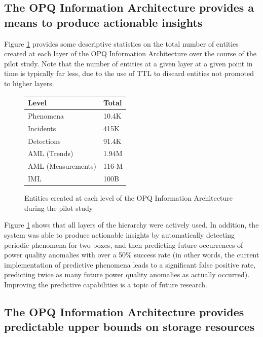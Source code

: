 \subsection{The OPQ Information Architecture provides a means to produce actionable insights}

Figure \ref{fig:level-statistics} provides some descriptive statistics on the total number of entities created at each layer of the OPQ Information Architecture over the course of the pilot study. Note that the number of entities at a given layer at a given point in time is typically far less, due to the use of TTL to discard entities not promoted to higher layers.

\begin{figure}[ht]
  \centering
		 \begin{tabularx}{.4\textwidth}{lX}
       \toprule
       \textbf{Level} & \textbf{Total}  \\
       \midrule
       Phenomena & 10.4K \\
       Incidents & 415K \\
       Detections & 91.4K \\
       AML (Trends) & 1.94M \\
       AML (Measurements) & 116 M \\
       IML  & 100B \\
       \bottomrule
     \end{tabularx}
	\caption{Entities created at each level of the OPQ Information Architecture during the pilot study}
	\label{fig:level-statistics}
\end{figure}

Figure \ref{fig:level-statistics} shows that all layers of the hierarchy were actively used. In addition, the system was able to produce actionable insights by automatically detecting periodic phenomena for two boxes, and then predicting future occurrences of power quality anomalies with over a 50\% success rate (in other words, the current implementation of predictive phenomena leads to a significant false positive rate, predicting twice as many future power quality anomalies as actually occurred). Improving the predictive capabilities is a topic of future research.

\subsection{The OPQ Information Architecture provides predictable upper bounds on storage resources}

